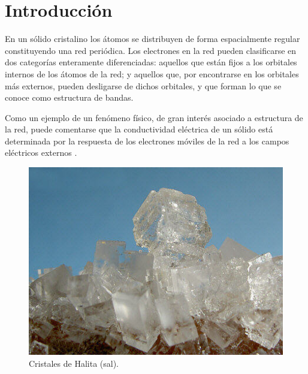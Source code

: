 \chapter*{Introducción}

En un sólido cristalino los átomos se distribuyen de forma espacialmente regular constituyendo una red  periódica. Los electrones en la red pueden clasificarse en dos categorías enteramente diferenciadas: aquellos que están fijos a los orbitales internos de los átomos de la red; y aquellos que, por encontrarse en los orbitales más externos, pueden desligarse de dichos orbitales, y que forman lo que se conoce como estructura de bandas. 

Como un ejemplo de un fenómeno físico, de gran interés asociado a estructura de la red, puede comentarse que la conductividad eléctrica de un sólido está determinada por la respuesta de los electrones móviles de la red a los campos eléctricos externos \cite{kittel}. 

\begin{figure}[h]
    \centering\includegraphics[scale=0.5]{./imagenes/NA-CL-Halit-Kristalle.jpg}
    \caption{Cristales de Halita (sal).}
    \label{fig:NACL_1}
\end{figure}

